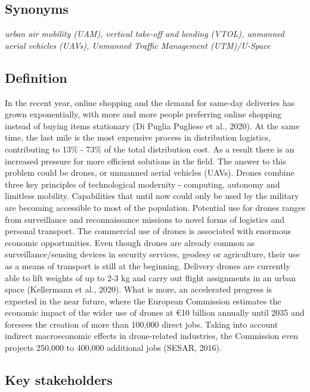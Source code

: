 \documentclass[
]{book}
\begin{document}
\hypertarget{synonyms-16}{%
\subsection*{Synonyms}\label{synonyms-16}}

\emph{urban air mobility (UAM), vertical take-off and landing (VTOL), unmanned aerial vehicles (UAVs), Unmanned Traffic Management (UTM)/U-Space}

\hypertarget{definition-18}{%
\subsection*{Definition}\label{definition-18}}

In the recent year, online shopping and the demand for same-day deliveries has grown exponentially, with more and more people preferring online shopping instead of buying items stationary (Di Puglia Pugliese et al., 2020). At the same time, the last mile is the most expensive process in distribution logistics, contributing to 13\% - 73\% of the total distribution cost. As a result there is an increased pressure for more efficient solutions in the field. The answer to this problem could be drones, or unmanned aerial vehicles (UAVs). Drones combine three key principles of technological modernity - computing, autonomy and limitless mobility. Capabilities that until now could only be used by the military are becoming accessible to most of the population. Potential use for drones ranges from surveillance and reconnaissance missions to novel forms of logistics and personal transport. The commercial use of drones is associated with enormous economic opportunities. Even though drones are already common as surveillance/sensing devices in security services, geodesy or agriculture, their use as a means of transport is still at the beginning. Delivery drones are currently able to lift weights of up to 2-3 kg and carry out flight assignments in an urban space (Kellermann et al., 2020).
What is more, an accelerated progress is expected in the near future, where the European Commission estimates the economic impact of the wider use of drones at €10 billion annually until 2035 and foresees the creation of more than 100,000 direct jobs. Taking into account indirect macroeconomic effects in drone-related industries, the Commission even projects 250,000 to 400,000 additional jobs (SESAR, 2016).

\hypertarget{key-stakeholders-18}{%
\subsection*{Key stakeholders}\label{key-stakeholders-18}}
\end{document}
